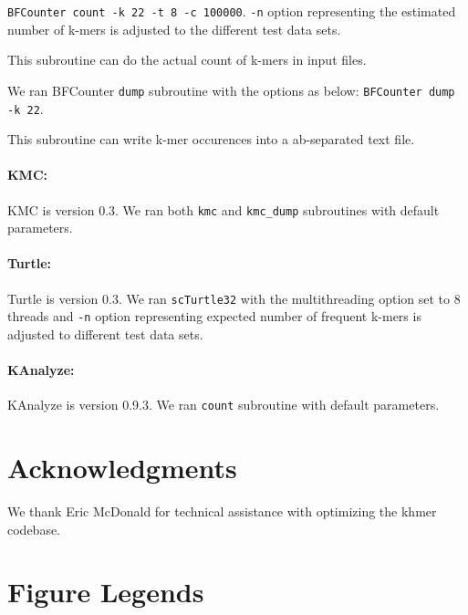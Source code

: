 \documentclass[10pt]{article}
\begin{document}
 {\tt BFCounter count -k 22 -t 8 -c 100000}.
 {\tt -n} option representing the estimated number of k-mers is adjusted to the different 
 test data sets.
 
 This subroutine can do the actual count of k-mers in input files.
 
We ran BFCounter {\tt dump} subroutine with the options as below:
 {\tt BFCounter dump -k 22}.
 
This subroutine can write k-mer occurences into a ab-separated text file.

\paragraph{KMC:} KMC is version 0.3. We ran both {\tt kmc} and {\tt kmc\_dump} subroutines 
with default parameters.


\paragraph{Turtle:} Turtle is version 0.3. We ran {\tt scTurtle32} with the multithreading 
option set to 8 threads and {\tt -n} option representing expected number of frequent k-mers
is adjusted to different test data sets.

\paragraph{KAnalyze:} KAnalyze is version 0.9.3. We ran {\tt count} subroutine 
with default parameters.


 
\section*{Acknowledgments}

We thank Eric McDonald for technical assistance with optimizing the khmer codebase.


%



\clearpage

\section*{Figure Legends}
\end{document}
